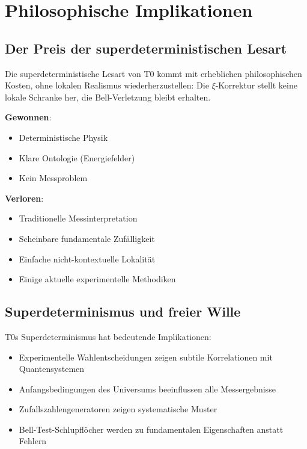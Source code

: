 	\section{Philosophische Implikationen}
	
	\subsection{Der Preis der superdeterministischen Lesart}
	
	Die superdeterministische Lesart von T0 kommt mit erheblichen philosophischen Kosten, ohne lokalen Realismus wiederherzustellen: Die $\xi$-Korrektur stellt keine lokale Schranke her, die Bell-Verletzung bleibt erhalten.
	
	\begin{tcolorbox}[colback=purple!5!white,colframe=purple!75!black,title=Philosophische Abwägungen]
		\textbf{Gewonnen}:
		\begin{itemize}
			\item Deterministische Physik
			\item Klare Ontologie (Energiefelder)
			\item Kein Messproblem
		\end{itemize}
		
		\textbf{Verloren}:
		\begin{itemize}
			\item Traditionelle Messinterpretation
			\item Scheinbare fundamentale Zufälligkeit
			\item Einfache nicht-kontextuelle Lokalität
			\item Einige aktuelle experimentelle Methodiken
		\end{itemize}
	\end{tcolorbox}
	
	\subsection{Superdeterminismus und freier Wille}
	
	T0s Superdeterminismus hat bedeutende Implikationen:
	
	\begin{itemize}
		\item Experimentelle Wahlentscheidungen zeigen subtile Korrelationen mit Quantensystemen
		\item Anfangsbedingungen des Universums beeinflussen alle Messergebnisse
		\item Zufallszahlengeneratoren zeigen systematische Muster
		\item Bell-Test-Schlupflöcher werden zu fundamentalen Eigenschaften anstatt Fehlern
	\end{itemize}
	
